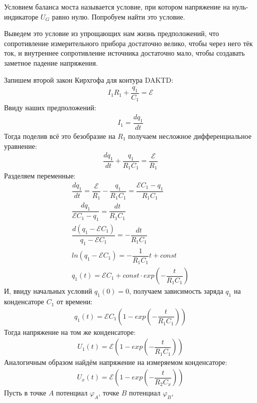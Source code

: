 \documentclass[a4paper, usenames, dvipsnames]{article}
\begin{document}
Условием баланса моста называется условие,
при котором напряжение на нуль-индикаторе $U_G$ равно нулю.
Попробуем найти это условие.

Выведем это условие из упрощающих нам жизнь предположений,
что сопротивление измерительного прибора достаточно велико,
чтобы через него тёк ток, и внутреннее сопротивление источника достаточно мало,
чтобы создавать заметное падение напряжения.

Запишем второй закон Кирхгофа для контура DAKTD:
\begin{gather*}
    I_1R_1 + \dfrac{q_1}{C_1} = \mathcal{E}
\end{gather*}
Ввиду наших предположений:
\begin{gather*}
    I_1 = \dfrac{dq_1}{dt}
\end{gather*}
Тогда поделив всё это безобразие на $R_1$ получаем
несложное дифференциальное уравнение:
\begin{gather*}
    \dfrac{dq_1}{dt} + \dfrac{q_1}{R_1C_1} = \dfrac{\mathcal{E}}{R_1}
\end{gather*}
Разделяем переменные:
\begin{gather*}
    \dfrac{dq_1}{dt} = \dfrac{\mathcal{E}}{R_1} - \dfrac{q_1}{R_1C_1} = \dfrac{\mathcal{E}C_1 - q_1}{R_1C_1} \\
    \dfrac{dq_1}{\mathcal{E}C_1 - q_1} = \dfrac{dt}{R_1C_1} \\
    \dfrac{d(q_1 - \mathcal{E}C_1)}{q_1 - \mathcal{E}C_1} = - \dfrac{dt}{R_1C_1} \\
    ln(q_1 - \mathcal{E}C_1) = - \dfrac{1}{R_1C_1}t + const \\
    q_1(t) = \mathcal{E}C_1 + const \cdot exp\left(-\dfrac{t}{R_{1}C_{1}}\right)
\end{gather*}
И, ввиду начальных условий $q_1(0) = 0$, получаем зависимость заряда $q_1$
на конденсаторе $C_1$ от времени:
\begin{gather*}
    q_1(t) = \mathcal{E}C_1\left(1 - exp\left(-\dfrac{t}{R_{1}C_{1}}\right)\right)
\end{gather*}
Тогда напряжение на том же конденсаторе:
\begin{gather*}
    U_1(t) = \mathcal{E}\left(1 - exp\left(-\dfrac{t}{R_{1}C_{1}}\right)\right)
\end{gather*}
Аналогичным образом найдём напряжение на измеряемом конденсаторе:
\begin{gather*}
    U_x(t) = \mathcal{E}\left(1 - exp\left(-\dfrac{t}{R_{2}C_x}\right)\right)
\end{gather*}
Пусть в точке $A$ потенциал $\varphi_A$, точке $B$ потенциал $\varphi_B$,
\end{document}
